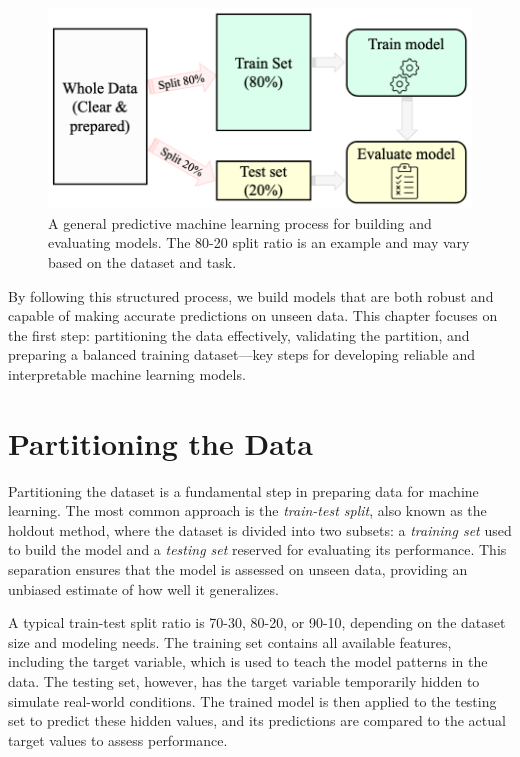 \documentclass[
]{book}
\theoremstyle{definition}
\theoremstyle{definition}
\theoremstyle{definition}
\theoremstyle{definition}
\theoremstyle{remark}
\begin{document}
\begin{figure}

{\centering \includegraphics[width=0.8\linewidth]{images/partitioning} 

}

\caption{A general predictive machine learning process for building and evaluating models. The 80-20 split ratio is an example and may vary based on the dataset and task.}\label{fig:modeling}
\end{figure}

By following this structured process, we build models that are both robust and capable of making accurate predictions on unseen data. This chapter focuses on the first step: partitioning the data effectively, validating the partition, and preparing a balanced training dataset---key steps for developing reliable and interpretable machine learning models.

\section{Partitioning the Data}\label{sec-partitioning}

Partitioning the dataset is a fundamental step in preparing data for machine learning. The most common approach is the \emph{train-test split}, also known as the holdout method, where the dataset is divided into two subsets: a \emph{training set} used to build the model and a \emph{testing set} reserved for evaluating its performance. This separation ensures that the model is assessed on unseen data, providing an unbiased estimate of how well it generalizes.

A typical train-test split ratio is 70-30, 80-20, or 90-10, depending on the dataset size and modeling needs. The training set contains all available features, including the target variable, which is used to teach the model patterns in the data. The testing set, however, has the target variable temporarily hidden to simulate real-world conditions. The trained model is then applied to the testing set to predict these hidden values, and its predictions are compared to the actual target values to assess performance.
\end{document}
